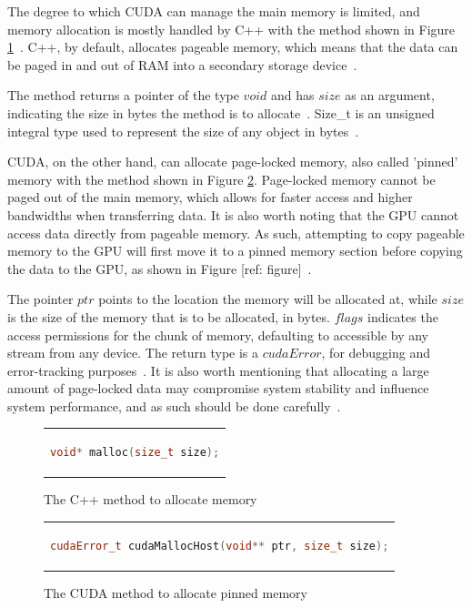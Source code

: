  The degree to which CUDA can manage the main memory is limited, and memory allocation is mostly handled by C++ with the method shown in Figure \ref{fig:malloc}~\cite{noauthor_malloc_2021}. C++, by default, allocates pageable memory, which means that the data can be paged in and out of RAM into a secondary storage device~\cite{nvidia_unified_2017}.
 
 The method returns a pointer of the type $void$ and has $size$ as an argument, indicating the size in bytes the method is to allocate~\cite{noauthor_malloc_2021}. Size\_t is an unsigned integral type used to represent the size of any object in bytes~\cite{noauthor_size_t_2021}. 
  
 CUDA, on the other hand, can allocate page-locked memory, also called 'pinned' memory with the method shown in Figure \ref{fig:mallochost}. Page-locked memory cannot be paged out of the main memory, which allows for faster access and higher bandwidths when transferring data. It is also worth noting that the GPU cannot access data directly from pageable memory. As such, attempting to copy pageable memory to the GPU will first move it to a pinned memory section before copying the data to the GPU, as shown in Figure [ref: figure]~\cite{nvidia_how_2012}.
 
The pointer $ptr$ points to the location the memory will be allocated at, while $size$  is the size of the memory that is to be allocated, in bytes. $flags$ indicates the access permissions for the chunk of memory, defaulting to accessible by any stream from any device. The return type is a $cudaError$, for debugging and error-tracking purposes~\cite{nvidia_cuda_2022-1}.
 It is also worth mentioning that allocating a large amount of page-locked data may compromise system stability and influence system performance, and as such should be done carefully~\cite{nvidia_how_2012}.

  \begin{figure}[htpb]
 	\centering
 	\begin{tabular}{c}
 		\begin{lstlisting}[language=C++]
 			void* malloc(size_t size);
 		\end{lstlisting}
 	\end{tabular}
 	\caption[C++ memory allocation]{The C++ method to allocate memory\cite{noauthor_malloc_2021}}
 	\label{fig:malloc}
 \end{figure}
 
  \begin{figure}[htpb]
 	\centering
 	\begin{tabular}{c}
 		\begin{lstlisting}[language=C++]
 			cudaError_t cudaMallocHost(void** ptr, size_t size);
 		\end{lstlisting}
 	\end{tabular}
 	\caption[CUDA pinned host memory allocation]{The CUDA method to allocate pinned memory \cite{nvidia_cuda_2022-1}}
 	\label{fig:mallochost}
 \end{figure}
 
